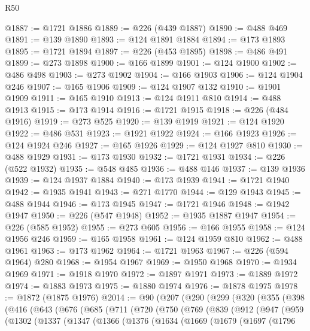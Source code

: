 \begin{lexlean}{R50}
\begin{coremodule}
{{{{{{{{{{{{{{{{{{{{{{{{{{{{{{{{{{{{{{{{{{{{{{{{{{{{{{{{{{{{@1887 := @1721 @1886
@1889 := @226 (@439 @1887)
@1890 := @488 @469
@1891 := @139 @1890
@1893 := @124 @1891 @1884
@1894 := @173 @1893
@1895 := @1721 @1894
@1897 := @226 (@453 @1895)
@1898 := @486 @491
@1899 := @273 @1898
@1900 := @166 @1899
@1901 := @124 @1900
@1902 := @486 @498
@1903 := @273 @1902
@1904 := @166 @1903
@1906 := @124 @1904 @246
@1907 := @165 @1906
@1909 := @124 @1907 @132
@1910 := @1901 @1909
@1911 := @165 @1910
@1913 := @124 @1911 @810
@1914 := @488 @1913
@1915 := @173 @1914
@1916 := @1721 @1915
@1918 := @226 (@484 @1916)
@1919 := @273 @525
@1920 := @139 @1919
@1921 := @124 @1920
@1922 := @486 @531
@1923 := @1921 @1922
@1924 := @166 @1923
@1926 := @124 @1924 @246
@1927 := @165 @1926
@1929 := @124 @1927 @810
@1930 := @488 @1929
@1931 := @173 @1930
@1932 := @1721 @1931
@1934 := @226 (@522 @1932)
@1935 := @548 @485
@1936 := @488 @146
@1937 := @139 @1936
@1939 := @124 @1937 @1884
@1940 := @173 @1939
@1941 := @1721 @1940
@1942 := @1935 @1941
@1943 := @271 @1770
@1944 := @129 @1943
@1945 := @488 @1944
@1946 := @173 @1945
@1947 := @1721 @1946
@1948 := @1942 @1947
@1950 := @226 (@547 @1948)
@1952 := @1935 @1887 @1947
@1954 := @226 (@585 @1952)
@1955 := @273 @605
@1956 := @166 @1955
@1958 := @124 @1956 @246
@1959 := @165 @1958
@1961 := @124 @1959 @810
@1962 := @488 @1961
@1963 := @173 @1962
@1964 := @1721 @1963
@1967 := @226 (@594 @1964) @280
@1968 := @1954 @1967
@1969 := @1950 @1968
@1970 := @1934 @1969
@1971 := @1918 @1970
@1972 := @1897 @1971
@1973 := @1889 @1972
@1974 := @1883 @1973
@1975 := @1880 @1974
@1976 := @1878 @1975
@1978 := @1872 (@1875 @1976)
@2014 := @90
    (@207
      (@290
        (@299
          (@320
            (@355
              (@398
                (@416
                  (@643
                    (@676
                      (@685
                        (@711
                          (@720
                            (@750
                              (@769
                                (@839
                                  (@912
                                    (@947
                                      (@959
                                        (@1302
                                          (@1337
                                            (@1347
                                              (@1366
                                                (@1376
                                                  (@1634
                                                    (@1669
                                                      (@1679
                                                        (@1697
                                                          (@1796
}}}}}}}}}}}}}}}}}}}}}}}}}}}}}}}}}}}}}}}}}}}}}}}}}}}}}}}}}}}}
\end{coremodule}
\end{lexlean}
